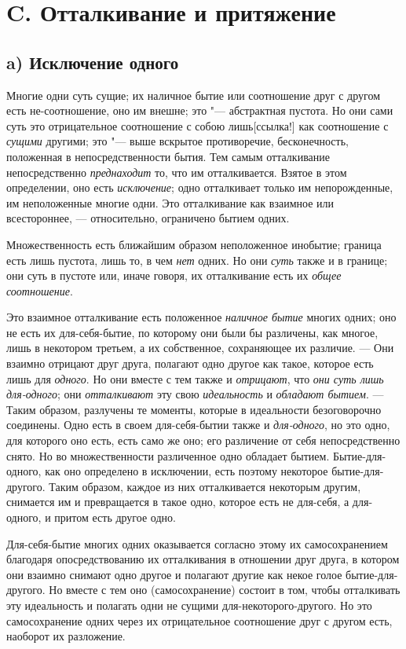 \bigskip

\section*{C. Отталкивание и притяжение}
\subsection*{a) Исключение одного}
Многие одни суть сущие; их наличное бытие или соотношение друг с другом есть
не-соотношение, оно им внешне; это "--- абстрактная пустота. Но они сами суть
это отрицательное соотношение с собою
лишь[ссылка!] как соотношение с
{\em сущими} другими; это "--- выше вскрытое противоречие,
бесконечность, положенная в непосредственности бытия. Тем самым
отталкивание непосредственно {\em преднаходит} то, что
им отталкивается. Взятое в этом определении, оно есть
{\em исключение}; одно отталкивает только им
непорожденные, им неположенные многие одни. Это отталкивание как взаимное
или всестороннее, — относительно, ограничено бытием одних.

Множественность есть ближайшим образом неположенное инобытие; граница есть
лишь пустота, лишь то, в чем {\em нет} одних. Но они
{\em суть} также и в границе; они суть в пустоте или,
иначе говоря, их отталкивание есть их {\em общее
соотношение}.

Это взаимное отталкивание есть положенное {\em наличное
бытие} многих одних; оно не есть их для-себя-бытие, по которому они были бы
различены, как многое, лишь в некотором третьем, а их собственное,
сохраняющее их различие. — Они взаимно отрицают друг друга, полагают одно
другое как такое, которое есть лишь для {\em одного}.
Но они вместе с тем также и {\em отрицают}, что
{\em они суть лишь для-одного}; они
{\em отталкивают} эту свою
{\em идеальность} и {\em обладают
бытием}. — Таким образом, разлучены те моменты, которые в идеальности
безоговорочно соединены. Одно есть в своем для-себя-бытии также и
{\em для-одного}, но это одно, для которого оно есть,
есть само же оно; его различение от себя непосредственно снято. Но во
множественности различенное одно обладает бытием. Бытие-для-одного, как оно
определено в исключении, есть поэтому некоторое бытие-для-другого. Таким
образом, каждое из них отталкивается некоторым другим, снимается им и
превращается в такое одно, которое есть не для-себя, а для-одного, и притом
есть другое одно.

Для-себя-бытие многих одних оказывается согласно этому их самосохранением
благодаря опосредствованию их отталкивания в отношении друг друга, в
котором они взаимно снимают одно другое и полагают другие как некое голое
бытие-для-другого. Но вместе с тем оно (самосохранение) состоит в том,
чтобы отталкивать эту идеальность и полагать одни не сущими
для-некоторого-другого. Но это самосохранение одних через их отрицательное
соотношение друг с другом есть, наоборот их разложение.

